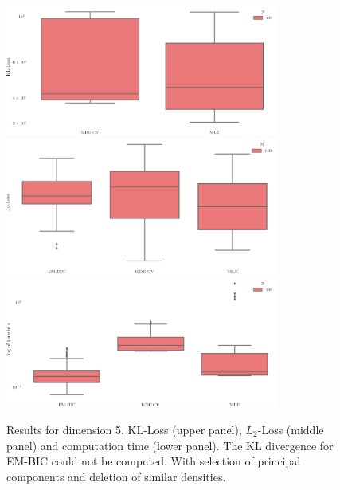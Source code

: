 \begin{figure}
\center
    \includegraphics[width=0.8\textwidth]{./TeX_files/dict_gen_loss_dim_5_KL_gof_pc_select.png}
    \includegraphics[width=0.8\textwidth]{./TeX_files/dict_gen_loss_dim_5_L2_gof_pc_select.png}
    \includegraphics[width=0.8\textwidth]{./TeX_files/dict_gen_time_dim_5_gof_pc_select.png}
    \caption{Results for dimension 5. KL-Loss (upper panel), $L_2$-Loss (middle panel) and computation time (lower panel). The KL divergence for EM-BIC could not be computed. With selection of principal components and deletion of similar densities.}
    \label{fig:result_dict_gen_dim_5_gof_pc_select}
\end{figure}